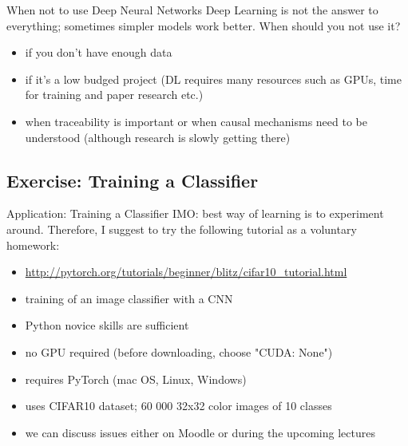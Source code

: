 \documentclass{beamer}
\begin{document}
\begin{frame}{When not to use Deep Neural Networks}
Deep Learning is not the answer to everything; sometimes simpler models work 
better. When should you not use it?
\begin{itemize}
\item if you don't have enough data
\item if it's a low budged project (DL requires many resources such as GPUs,  time for training and paper research etc.)
\item when traceability is important or when causal mechanisms need to be understood (although research is slowly getting there)
\end{itemize}
\end{frame}


\subsection{Exercise: Training a Classifier}

\begin{frame}{Application: Training a Classifier}
IMO: best way of learning is to experiment around. Therefore, I suggest to try the following tutorial as a voluntary homework:
\begin{itemize}
\item \url{http://pytorch.org/tutorials/beginner/blitz/cifar10_tutorial.html}
\item training of an image classifier with a CNN
\item Python novice skills are sufficient
\item no GPU required (before downloading, choose "CUDA: None")
\item requires PyTorch (mac OS, Linux, Windows)
\item uses CIFAR10 dataset; 60 000 32x32 color images of 10 classes
\item we can discuss issues either on Moodle or during the upcoming lectures
\end{itemize}
\end{frame}
\end{document}
